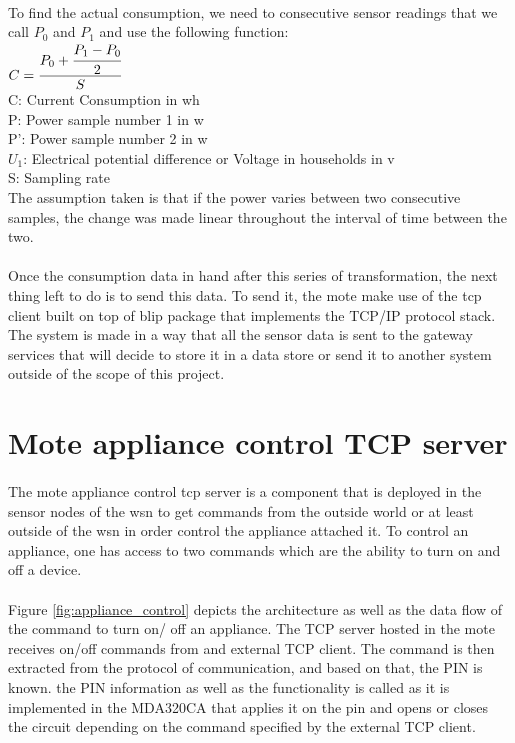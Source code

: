 \documentclass[oneside,12pt,a4paper,final]{book}
\begin{document}
\paragraph{}
To find the actual consumption, we need to consecutive sensor readings that we call $P_0$ and $P_1$ and use the following function:
\\
$ C = \cfrac{P_0 + \cfrac{P_1 - P_0}{2}}{S} $ \\
C: Current Consumption in \gls{wh} \\
P: Power sample number 1 in \gls{w} \\
P': Power sample number 2 in \gls{w} \\
$U_1$: Electrical potential difference or Voltage in households in \gls{v} \\
S: Sampling rate \\
The assumption taken is that if the power varies between two consecutive samples, the change was made linear throughout the interval of time between the two.
\paragraph{}
Once the consumption data in hand after this series of transformation, the next thing left to do is to send this data. To send it, the mote make use of the \gls{tcp}  client built on top of \gls{blip} package that implements the TCP/IP protocol stack. The system is made in a way that all the sensor data is sent to the gateway services that will decide to store it in a data store or send it to another system outside of the scope of this project.
\section{ Mote appliance control TCP server}
\paragraph{}
The mote appliance control \gls{tcp} server is a component that is deployed in the sensor nodes of the \gls{wsn} to get commands from the outside world or at least outside of the \gls{wsn} in order control the appliance attached it. To control an appliance, one has access to two commands which are the ability to turn on and off a device.
\paragraph{}
Figure \ref{fig:appliance_control} depicts the architecture as well as the data flow of the command to turn on/ off an appliance. The TCP server hosted in the mote receives on/off commands from and external TCP client. The command is then extracted from the protocol of communication, and based on that, the PIN is known. the PIN information as well as the functionality is called as it is implemented in the MDA320CA that applies it on the pin and opens or closes the circuit depending on the command specified by the external TCP client.
\end{document}
